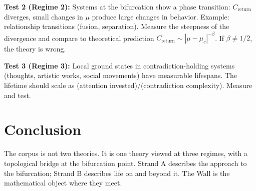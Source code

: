 \documentclass[12pt]{article}
\begin{document}
\textbf{Test 2 (Regime 2):} Systems at the bifurcation show a phase transition: $C_{\text{return}}$ diverges, small changes in $\mu$ produce large changes in behavior. Example: relationship transitions (fusion, separation). Measure the steepness of the divergence and compare to theoretical prediction $C_{\text{return}} \sim |\mu - \mu_c|^{-\beta}$. If $\beta \neq 1/2$, the theory is wrong.

\textbf{Test 3 (Regime 3):} Local ground states in contradiction-holding systems (thoughts, artistic works, social movements) have measurable lifespans. The lifetime should scale as (attention invested)/(contradiction complexity). Measure and test.

\section{Conclusion}

The corpus is not two theories. It is one theory viewed at three regimes, with a topological bridge at the bifurcation point. Strand A describes the approach to the bifurcation; Strand B describes life on and beyond it. The Wall is the mathematical object where they meet.
\end{document}
